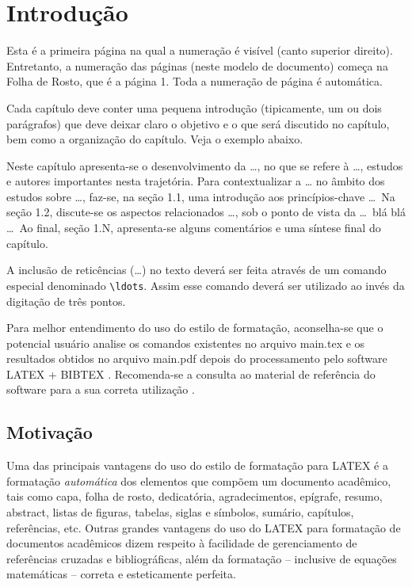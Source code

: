 %
%

\chapter{Introdução}\label{chap:introducao}

Esta é a primeira página na qual a numeração é visível (canto superior direito).
Entretanto, a numeração das páginas (neste modelo de documento) começa na Folha de Rosto, que é a página 1. Toda a numeração de página é automática.

Cada capítulo deve conter uma pequena introdução (tipicamente, um ou dois parágrafos) que deve deixar claro o objetivo e o que será discutido no capítulo, bem como a organização do capítulo. Veja o exemplo abaixo.

Neste capítulo apresenta-se o desenvolvimento da \ldots, no que se refere à \ldots, estudos e autores importantes nesta trajetória. Para contextualizar a \ldots\mbox{} no âmbito dos estudos sobre \ldots, faz-se, na seção 1.1, uma introdução aos princípios-chave \ldots\mbox{ }Na seção 1.2, discute-se os aspectos relacionados \ldots, sob o ponto de vista da \ldots\mbox{ }blá blá \ldots\mbox{ }Ao final, seção 1.N, apresenta-se alguns comentários e uma síntese final do capítulo.

A inclusão de reticências (\ldots) no texto deverá ser feita através de um comando especial denominado \verb|\ldots|. Assim esse comando deverá ser utilizado ao invés da digitação de três pontos.

Para melhor entendimento do uso do estilo de formatação, aconselha-se que o potencial usuário analise os comandos existentes no arquivo {\ttfamily main.tex} e os resultados obtidos no arquivo {\ttfamily main.pdf} depois do processamento pelo software LATEX + BIBTEX \cite{LaTeX2009,BibTeX2009}. Recomenda-se a consulta ao material de referência do software para a sua correta utilização \cite{Lamport1986,Buerger1989,Kopka2003,Mittelbach2004}.

\section{Motivação}
\label{sec:motivacao}

Uma das principais vantagens do uso do estilo de formatação para LATEX é a formatação \textit{automática} dos elementos que compõem um documento acadêmico, tais como capa, folha de rosto, dedicatória, agradecimentos, epígrafe, resumo, abstract, listas de figuras, tabelas, siglas e símbolos, sumário, capítulos, referências, etc. Outras grandes vantagens do uso do LATEX para formatação de documentos acadêmicos dizem respeito à facilidade de gerenciamento de referências cruzadas e bibliográficas, além da formatação -- inclusive de equações matemáticas -- correta e esteticamente perfeita.

